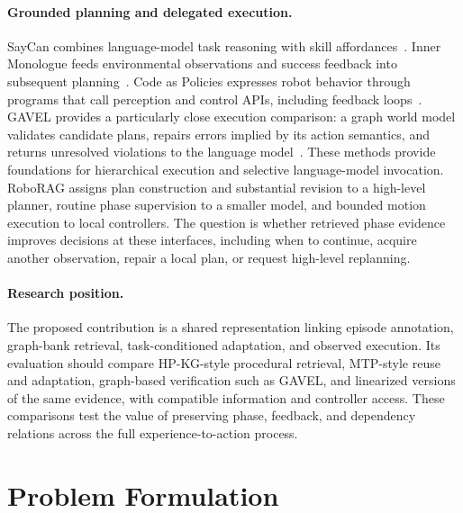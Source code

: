 \documentclass[10pt,twocolumn,letterpaper]{article}
\begin{document}
\paragraph{Grounded planning and delegated execution.}
SayCan combines language-model task reasoning with skill affordances~\cite{saycan2022}. Inner Monologue feeds environmental observations and success feedback into subsequent planning~\cite{innermonologue2022}. Code as Policies expresses robot behavior through programs that call perception and control APIs, including feedback loops~\cite{codepolicies2022}. GAVEL provides a particularly close execution comparison: a graph world model validates candidate plans, repairs errors implied by its action semantics, and returns unresolved violations to the language model~\cite{gavel2026}. These methods provide foundations for hierarchical execution and selective language-model invocation. RoboRAG assigns plan construction and substantial revision to a high-level planner, routine phase supervision to a smaller model, and bounded motion execution to local controllers. The question is whether retrieved phase evidence improves decisions at these interfaces, including when to continue, acquire another observation, repair a local plan, or request high-level replanning.

\paragraph{Research position.}
The proposed contribution is a shared representation linking episode annotation, graph-bank retrieval, task-conditioned adaptation, and observed execution. Its evaluation should compare HP-KG-style procedural retrieval, MTP-style reuse and adaptation, graph-based verification such as GAVEL, and linearized versions of the same evidence, with compatible information and controller access. These comparisons test the value of preserving phase, feedback, and dependency relations across the full experience-to-action process.



\section{Problem Formulation}
\label{sec:formulation}
\end{document}
